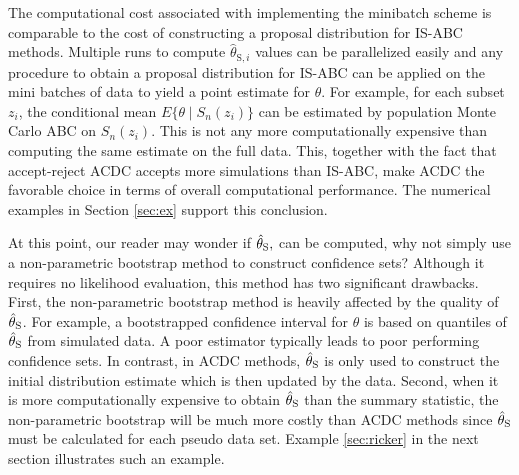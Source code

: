 The computational cost associated with implementing  the minibatch scheme is comparable to %
the cost of constructing a proposal distribution for IS-ABC methods.
Multiple runs to compute $\hat{\theta}_{\text{S},i}$ values can be parallelized easily and any procedure to obtain a proposal distribution for IS-ABC %
can be applied on the mini batches of data to yield a point estimate for $\theta$. For example, for each subset $z_i$, the conditional mean $E\{\theta\mid S_{n}(z_i)\}$ can be estimated by population Monte Carlo ABC %
on $S_{n}(z_i)$. This is not any more computationally expensive than computing the same estimate on the full data. This, together with the fact that accept-reject ACDC accepts more simulations than IS-ABC, 
make ACDC the favorable choice %
in terms of overall computational performance. The numerical examples in Section \ref{sec:ex} support this conclusion.    
	
At this point, our reader may wonder if $\hat{\theta}_{\text{S}},$ can be computed, why not simply use a non-parametric bootstrap method to construct confidence sets? Although it requires no likelihood evaluation, this method has two significant drawbacks. First, the non-parametric bootstrap method is heavily affected by the quality of $\hat{\theta}_{\text{S}}$. For example, a bootstrapped confidence interval for $\theta$ is based on quantiles of $\hat{\theta}_{\text{S}}$ from simulated data. A poor estimator typically leads to poor performing confidence sets. In contrast, in ACDC methods, $\hat{\theta}_{\text{S}}$ is only used to construct the initial distribution estimate which is then updated by the data. Second, when it is more computationally expensive to obtain $\hat{\theta}_{\text{S}}$ than the summary statistic, the non-parametric bootstrap will be much more costly than ACDC methods since $\hat{\theta}_{\text{S}}$ must be calculated for each pseudo data set. Example \ref{sec:ricker} in the next section illustrates such an example.

 